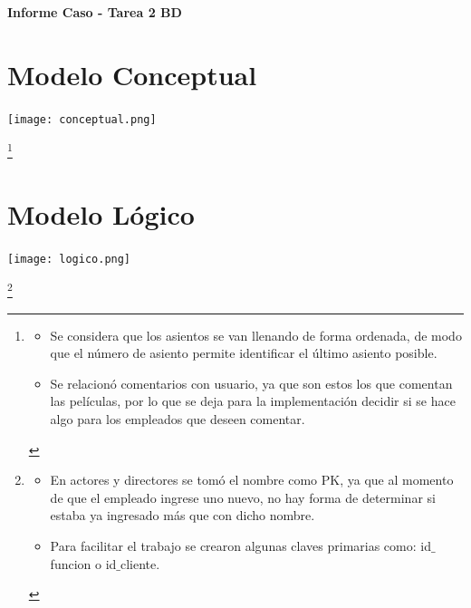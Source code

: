 \documentclass[11pt,letterpaper]{article}
\newcommand{\titulo}{Informe Caso - Tarea 2 BD}
\renewcommand{\maketitle}
{
\thispagestyle{fancy}
\begin{center}
\begin{Large}
\textbf{\titulo}\\
\end{Large}
\end{center}
\vspace{0.3cm}
}
\begin{document}
\maketitle
\section{Modelo Conceptual}
\vspace{0.6cm}
\begin{center}
	\texttt{[image: conceptual.png]}
\end{center}
\let\thefootnote\relax\footnote{
	\begin{itemize}
		\item Se considera que los asientos se van llenando de forma ordenada, de modo que el número de asiento permite identificar el último asiento posible.
		\item Se relacionó comentarios con usuario, ya que son estos los que comentan las películas, por lo que se deja para la implementación decidir si se hace algo para los empleados que deseen comentar.
	\end{itemize}
}

\newpage
\section{Modelo Lógico}
\vspace{0.6cm}
\begin{center}
	\texttt{[image: logico.png]}
\end{center}
\footnote{
	\begin{itemize}
		\item En actores y directores se tomó el nombre como PK, ya que al momento de que el empleado ingrese uno nuevo, no hay forma de determinar si estaba ya ingresado más que con dicho nombre.
		\item Para facilitar el trabajo se crearon algunas claves primarias como: id$\_$funcion o id$\_$cliente.
	\end{itemize}
}
\end{document}
